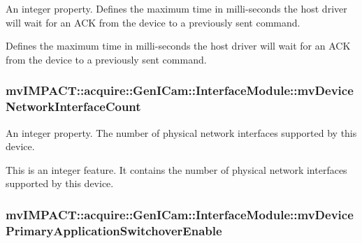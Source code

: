 An integer property. Defines the maximum time in milli-\/seconds the host driver will wait for an A\+C\+K from the device to a previously sent command. 

Defines the maximum time in milli-\/seconds the host driver will wait for an A\+C\+K from the device to a previously sent command. \hypertarget{classmv_i_m_p_a_c_t_1_1acquire_1_1_gen_i_cam_1_1_interface_module_a5e4bcdfcb02cc2ce0b47b35def64ae92}{
\subsubsection[{mv\+Device\+Network\+Interface\+Count}]{ mv\+I\+M\+P\+A\+C\+T\+::acquire\+::\+Gen\+I\+Cam\+::\+Interface\+Module\+::mv\+Device\+Network\+Interface\+Count}}\label{classmv_i_m_p_a_c_t_1_1acquire_1_1_gen_i_cam_1_1_interface_module_a5e4bcdfcb02cc2ce0b47b35def64ae92}


An integer property. The number of physical network interfaces supported by this device. 

This is an integer feature. It contains the number of physical network interfaces supported by this device. \hypertarget{classmv_i_m_p_a_c_t_1_1acquire_1_1_gen_i_cam_1_1_interface_module_a586bf3a6ba728934f75c42399990d897}{
\subsubsection[{mv\+Device\+Primary\+Application\+Switchover\+Enable}]{ mv\+I\+M\+P\+A\+C\+T\+::acquire\+::\+Gen\+I\+Cam\+::\+Interface\+Module\+::mv\+Device\+Primary\+Application\+Switchover\+Enable}}\label{classmv_i_m_p_a_c_t_1_1acquire_1_1_gen_i_cam_1_1_interface_module_a586bf3a6ba728934f75c42399990d897}


